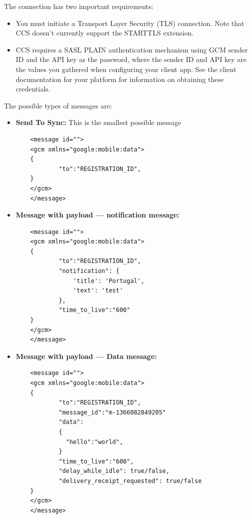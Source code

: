 The connection has two important requirements:
\begin{itemize}
\item You must initiate a Transport Layer Security (TLS) connection. Note that CCS doesn't currently support the STARTTLS extension.
\item CCS requires a SASL PLAIN authentication mechanism using GCM sender ID and the API key as the password, where the sender ID and API key are the values you gathered when configuring your client app. See the client documentation for your platform for information on obtaining these credentials.
\end{itemize}
The possible types of messages are:
\begin{itemize}
	\item \small\textbf{Send To Sync: } This is the smallest possible message
		\begin{lstlisting}
	<message id="">
  	<gcm xmlns="google:mobile:data">
  	{
      		"to":"REGISTRATION_ID",  
  	}
  	</gcm>
	</message>
		\end{lstlisting}
	\item \small\textbf{Message with payload — notification message: }
	\begin{lstlisting}
	<message id="">
  	<gcm xmlns="google:mobile:data">
  	{
      		"to":"REGISTRATION_ID",  	
     		"notification": {
        		'title': 'Portugal',
        		'text': 'test'
      		},
      		"time_to_live":"600"
	}
  	</gcm>
	</message>
		\end{lstlisting} 
	\item \small\textbf{Message with payload — Data message: }
	\begin{lstlisting}
	<message id="">
  	<gcm xmlns="google:mobile:data">
  	{
     		"to":"REGISTRATION_ID",
      		"message_id":"m-1366082849205"
      		"data":
      		{
        	  "hello":"world",
      		}
      		"time_to_live":"600",
      		"delay_while_idle": true/false,
      		"delivery_receipt_requested": true/false
  	}
  	</gcm>
	</message>
		\end{lstlisting} 
\end{itemize}
